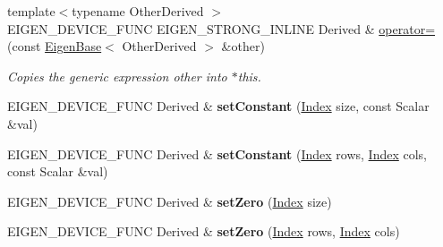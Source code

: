 \begin{DoxyCompactItemize}
\item 
{\footnotesize template$<$typename Other\+Derived $>$ }\\E\+I\+G\+E\+N\+\_\+\+D\+E\+V\+I\+C\+E\+\_\+\+F\+U\+NC E\+I\+G\+E\+N\+\_\+\+S\+T\+R\+O\+N\+G\+\_\+\+I\+N\+L\+I\+NE Derived \& \hyperlink{class_eigen_1_1_plain_object_base_a6d280056e43429f043e8b25262ee6153}{operator=} (const \hyperlink{group___core___module_struct_eigen_1_1_eigen_base}{Eigen\+Base}$<$ Other\+Derived $>$ \&other)
\begin{DoxyCompactList}\small\item\em Copies the generic expression {\itshape other} into $\ast$this. \end{DoxyCompactList}\item 
\mbox{\label{class_eigen_1_1_plain_object_base_aedea3678844e9842f43a444890fe4795}} 
E\+I\+G\+E\+N\+\_\+\+D\+E\+V\+I\+C\+E\+\_\+\+F\+U\+NC Derived \& {\bfseries set\+Constant} (\hyperlink{namespace_eigen_a62e77e0933482dafde8fe197d9a2cfde}{Index} size, const Scalar \&val)
\item 
\mbox{\label{class_eigen_1_1_plain_object_base_aee8f1c2c89ad23bdb8c848f94a2181b0}} 
E\+I\+G\+E\+N\+\_\+\+D\+E\+V\+I\+C\+E\+\_\+\+F\+U\+NC Derived \& {\bfseries set\+Constant} (\hyperlink{namespace_eigen_a62e77e0933482dafde8fe197d9a2cfde}{Index} rows, \hyperlink{namespace_eigen_a62e77e0933482dafde8fe197d9a2cfde}{Index} cols, const Scalar \&val)
\item 
\mbox{\label{class_eigen_1_1_plain_object_base_acff3f1f1aac2a9f7bf8db1172f92a855}} 
E\+I\+G\+E\+N\+\_\+\+D\+E\+V\+I\+C\+E\+\_\+\+F\+U\+NC Derived \& {\bfseries set\+Zero} (\hyperlink{namespace_eigen_a62e77e0933482dafde8fe197d9a2cfde}{Index} size)
\item 
\mbox{\label{class_eigen_1_1_plain_object_base_a0ade1c2e9526b0e5dda2599a569865ec}} 
E\+I\+G\+E\+N\+\_\+\+D\+E\+V\+I\+C\+E\+\_\+\+F\+U\+NC Derived \& {\bfseries set\+Zero} (\hyperlink{namespace_eigen_a62e77e0933482dafde8fe197d9a2cfde}{Index} rows, \hyperlink{namespace_eigen_a62e77e0933482dafde8fe197d9a2cfde}{Index} cols)
\item 
\mbox{\label{class_eigen_1_1_plain_object_base_ab32323467c9aafecfb18985e3beac856}} 

\end{DoxyCompactItemize}

